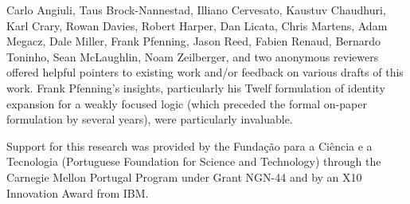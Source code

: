 \documentclass[acmtocl]{robtrans}\pdfoutput=1
\begin{document}
Carlo Angiuli, Taus Brock-Nannestad, Illiano Cervesato, 
Kaustuv Chaudhuri, Karl Crary,
Rowan Davies,
Robert Harper, Dan Licata, Chris Martens, Adam Megacz, Dale Miller,
Frank Pfenning, Jason Reed, Fabien Renaud, Bernardo Toninho, 
Sean McLaughlin, Noam Zeilberger, and
two anonymous reviewers offered helpful pointers to existing work
and/or feedback on various drafts of this work.  Frank Pfenning's
insights, particularly his Twelf formulation of identity expansion for
a weakly focused logic (which preceded the formal on-paper formulation
by several years), were particularly invaluable.

Support for this research was provided by the Funda\c{c}\~ao para a
Ci\^encia e a Tecnologia (Portuguese Foundation for Science and
Technology) through the Carnegie Mellon Portugal Program under Grant
NGN-44 and by an X10 Innovation Award from IBM.



\end{document}
